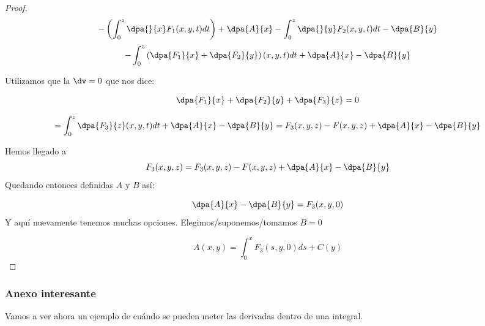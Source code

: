 \begin{proof}
\[-\left(\int_0^z \dpa{}{x}F_1(x,y,t)dt\right) + \dpa{A}{x} - \int_0^z \dpa{}{y}F_2(x,y,t)dt - \dpa{B}{y}\]
\[-\int_0^z \left(\dpa{F_1}{x} + \dpa{F_2}{y}\right)(x,y,t)dt + \dpa{A}{x} - \dpa{B}{y} \]

Utilizamos que la $\dv = 0$ que nos dice:

\[\dpa{F_1}{x} + \dpa{F_2}{y} + \dpa{F_3}{z} = 0\]

\[ = \int_0^z \dpa{F_3}{z} (x,y,t)dt + \dpa{A}{x} - \dpa{B}{y} = F_3(x,y,z) - F(x,y,z) + \dpa{A}{x} - \dpa{B}{y}\]

Hemos llegado a \[F_3(x,y,z) =  F_3(x,y,z) - F(x,y,z) + \dpa{A}{x} - \dpa{B}{y}\]
Quedando entonces definidas $A$ y $B$ así:

\[\dpa{A}{x} - \dpa{B}{y} = F_3(x,y,0)\]
Y aquí nuevamente tenemos muchas opciones. Elegimos/suponemos/tomamos $B=0$ 

\[A(x,y) = \int_0^x F_3(s,y,0)ds + C(y)\]
\end{proof}

\subsubsection{Anexo interesante}
Vamos a ver ahora un ejemplo de cuándo se pueden meter las derivadas dentro de una integral.

